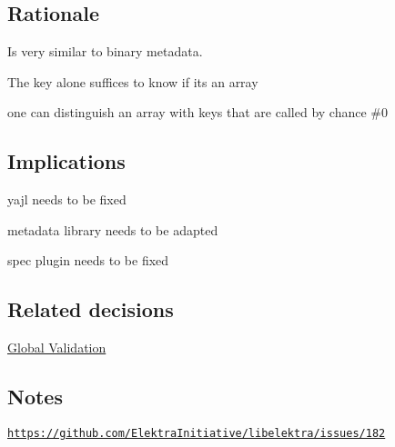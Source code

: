 

\subsection*{Rationale}


\begin{DoxyItemize}
\item Is very similar to {\ttfamily binary} metadata.
\item The key alone suffices to know if its an array
\item one can distinguish an array with keys that are called by chance \#0
\end{DoxyItemize}

\subsection*{Implications}


\begin{DoxyItemize}
\item yajl needs to be fixed
\item metadata library needs to be adapted
\item spec plugin needs to be fixed
\end{DoxyItemize}

\subsection*{Related decisions}


\begin{DoxyItemize}
\item \hyperlink{doc_decisions_global_validation_md}{Global Validation}
\end{DoxyItemize}

\subsection*{Notes}

\href{https://github.com/ElektraInitiative/libelektra/issues/182}{\tt https\+://github.\+com/\+Elektra\+Initiative/libelektra/issues/182} 